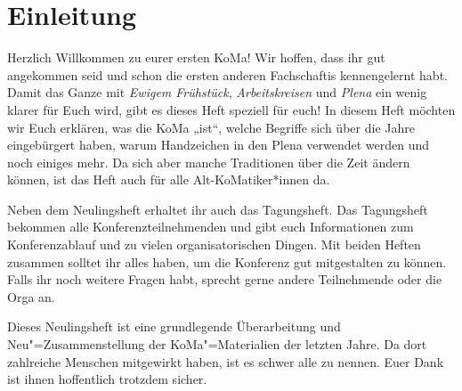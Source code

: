 \chapter{Einleitung}


Herzlich Willkommen zu eurer ersten KoMa!
Wir hoffen, dass ihr gut angekommen seid und schon die ersten anderen Fachschaftis kennengelernt habt.
Damit das Ganze mit \emph{Ewigem Frühstück}, \emph{Arbeitskreisen} und \emph{Plena} ein wenig klarer für Euch wird,
gibt es dieses Heft speziell für euch!
In diesem Heft möchten wir Euch erklären, was die KoMa „ist“, welche Begriffe sich über die Jahre eingebürgert haben,
warum Handzeichen in den Plena verwendet werden und noch einiges mehr.
Da sich aber manche Traditionen über die Zeit ändern können, ist das Heft auch für alle Alt-KoMatiker*innen da.

Neben dem Neulingsheft erhaltet ihr auch das Tagungsheft.
Das Tagungsheft bekommen alle Konferenzteilnehmenden und gibt euch Informationen zum Konferenzablauf und zu vielen organisatorischen Dingen.
Mit beiden Heften zusammen solltet ihr alles haben, um die Konferenz gut mitgestalten zu können.
Falls ihr noch weitere Fragen habt, sprecht gerne andere Teilnehmende oder die Orga an.

Dieses Neulingsheft ist eine grundlegende Überarbeitung und Neu"=Zusammenstellung der KoMa"=Materialien der letzten Jahre. %
Da dort zahlreiche Menschen mitgewirkt haben, ist es schwer alle zu nennen. Euer Dank ist ihnen hoffentlich trotzdem sicher.

